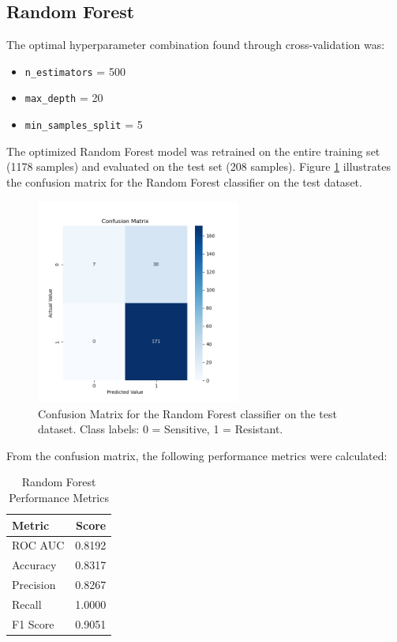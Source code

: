 \documentclass{article}
\begin{document}
\subsection{Random Forest}

The optimal hyperparameter combination found through cross-validation was:
\begin{itemize}
    \item \texttt{n\_estimators} = 500
    \item \texttt{max\_depth} = 20
    \item \texttt{min\_samples\_split} = 5
\end{itemize}

The optimized Random Forest model was retrained on the entire training set (1178 samples) and evaluated on the test set (208 samples). Figure \ref{fig:rf_confusion_matrix} illustrates the confusion matrix for the Random Forest classifier on the test dataset.

\begin{figure}[h]
  \centering
  \includegraphics[width=0.6\textwidth]{confusion_matrix_Random_Forest.png}
  \caption{Confusion Matrix for the Random Forest classifier on the test dataset. Class labels: 0 = Sensitive, 1 = Resistant.}
  \label{fig:rf_confusion_matrix}
\end{figure}

From the confusion matrix, the following performance metrics were calculated:

\begin{table}[h]
\centering
\caption{Random Forest Performance Metrics}
\label{tab:Random Forest Performance Metrics}
\begin{tabular}{lr}
\toprule
\textbf{Metric} & \textbf{Score} \\
\midrule
ROC AUC   & 0.8192 \\
Accuracy  & 0.8317 \\
Precision & 0.8267 \\
Recall    & 1.0000 \\
F1 Score  & 0.9051 \\
\bottomrule
\end{tabular}
\end{table}
\end{document}
